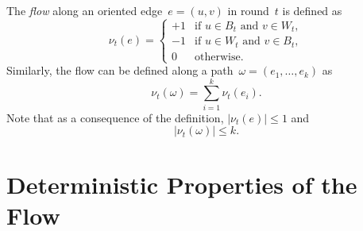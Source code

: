 \documentclass{article}
\newcommand{\inote}[1]{{\color{blue} ({\bf Isa:} #1)}}
\begin{document}
\begin{definition} [Flow] \label{def:flow}
    The {\em flow} along an oriented edge~$e = (u,v)$ in round~$t$ is defined as
    \begin{equation*}
        \nu_t(e) = \begin{cases}
            +1 & \text{if } u \in B_t \text{ and } v \in W_t, \\
            -1 & \text{if } u \in W_t \text{ and } v \in B_t, \\
            0 & \text{otherwise.}
        \end{cases}
    \end{equation*}
    Similarly, the flow can be defined along a path~$\omega = (e_1,\ldots,e_k)$ as
    \begin{equation*}
        \nu_t(\omega) = \sum_{i=1}^{k} \nu_t(e_i).
    \end{equation*}
    Note that as a consequence of the definition, $|\nu_t(e)| \leq 1$ and
    \begin{equation} \label{eq:max_flow}
        |\nu_t(\omega)| \leq k.
    \end{equation}
\end{definition}

\section{Deterministic Properties of the Flow} \label{sec:flow}
\end{document}
